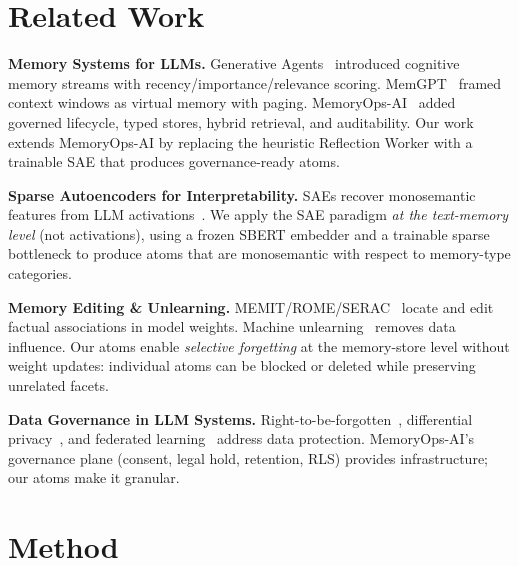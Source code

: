 \documentclass[11pt]{article}
\begin{document}
\section{Related Work}
\label{sec:related}

\vspace{0.5em}
\noindent\textbf{Memory Systems for LLMs.}
Generative Agents~\cite{park2023generative} introduced cognitive memory streams with recency/importance/relevance scoring. MemGPT~\cite{packer2023memgpt} framed context windows as virtual memory with paging. MemoryOps-AI~\cite{memoryops} added governed lifecycle, typed stores, hybrid retrieval, and auditability. Our work extends MemoryOps-AI by replacing the heuristic Reflection Worker with a trainable SAE that produces governance-ready atoms.

\vspace{0.5em}
\noindent\textbf{Sparse Autoencoders for Interpretability.}
SAEs recover monosemantic features from LLM activations~\cite{bricken2023sparse,cunningham2023sparse}. We apply the SAE paradigm \emph{at the text-memory level} (not activations), using a frozen SBERT embedder and a trainable sparse bottleneck to produce atoms that are monosemantic with respect to memory-type categories.

\vspace{0.5em}
\noindent\textbf{Memory Editing \& Unlearning.}
MEMIT/ROME/SERAC~\cite{meng2022locating, mitchell2022fast} locate and edit factual associations in model weights. Machine unlearning~\cite{ginart2019machine,bourtoule2021machine} removes data influence. Our atoms enable \emph{selective forgetting} at the memory-store level without weight updates: individual atoms can be blocked or deleted while preserving unrelated facets.

\vspace{0.5em}
\noindent\textbf{Data Governance in LLM Systems.}
Right-to-be-forgotten~\cite{ginart2019machine}, differential privacy~\cite{dwork2014algorithmic}, and federated learning~\cite{kairouz2021advances} address data protection. MemoryOps-AI's governance plane (consent, legal hold, retention, RLS) provides infrastructure; our atoms make it granular.

\section{Method}
\label{sec:method}
\end{document}
